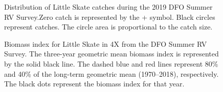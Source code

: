 \documentclass[11pt]{book}
\begin{document}
\begin{figure}[htb]

{\centering {} 

}

\caption{Distribution of Little Skate catches during the 2019 DFO Summer RV Survey.Zero catch is represented by the + symbol. Black circles represent catches. The circle area is proportional to the catch size.}\label{fig:95-map-littleskate}
\end{figure}

\begin{figure}[htb]

{\centering {} 

}

\caption{Biomass index for Little Skate in 4X from the DFO Summer RV Survey. The three-year geometric mean biomass index is represented by the solid black line. The dashed blue and red lines represent 80\% and 40\% of the long-term geometric mean (1970--2018), respectively. The black dots represent the biomass index for that year.}\label{fig:96-fig-littleskate-biomass4X}
\end{figure}
\end{document}
